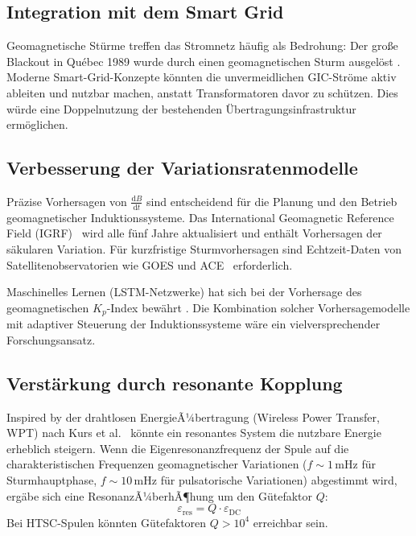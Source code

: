 ﻿\documentclass[a4paper,12pt]{article}
\theoremstyle{definition}
\begin{document}
\subsection{Integration mit dem Smart Grid}

Geomagnetische St\"urme treffen das Stromnetz h\"aufig als Bedrohung:
Der gro{\ss}e Blackout in Qu\'ebec 1989 wurde durch einen
geomagnetischen Sturm ausgel\"ost \cite{bolduc2002gic}. Moderne
Smart-Grid-Konzepte k\"onnten die unvermeidlichen GIC-Str\"ome
aktiv ableiten und nutzbar machen, anstatt Transformatoren davor zu sch\"utzen.
Dies w\"urde eine Doppelnutzung der bestehenden \"Ubertragungsinfrastruktur
erm\"oglichen.

\subsection{Verbesserung der Variationsratenmodelle}

Pr\"azise Vorhersagen von $\tfrac{\mathrm{d}B}{\mathrm{d}t}$ sind
entscheidend f\"ur die Planung und den Betrieb geomagnetischer
Induktionssysteme. Das International Geomagnetic Reference Field (IGRF)~\cite{thebault2015international}
wird alle f\"unf Jahre aktualisiert und enth\"alt Vorhersagen der
s\"akularen Variation. F\"ur kurzfristige Sturmvorhersagen sind
Echtzeit-Daten von Satellitenobservatorien wie GOES und
ACE~\cite{onsager2002operational} erforderlich.

Maschinelles Lernen (LSTM-Netzwerke) hat sich bei der Vorhersage
des geomagne\-tischen $K_p$-Index bew\"ahrt \cite{gruet2018multiple}.
Die Kombination solcher Vorhersagemodelle mit adaptiver Steuerung
der Induktionssysteme w\"are ein vielversprechender Forschungsansatz.

\subsection{Verst\"arkung durch resonante Kopplung}

Inspired by der drahtlosen EnergieÃ¼bertragung (Wireless Power Transfer, WPT)
nach Kurs et al.~\cite{kurs2007wireless} k\"onnte ein resonantes
System die nutzbare Energie erheblich steigern. Wenn die Eigenresonanzfrequenz
der Spule auf die charakteristischen Frequenzen geomagnetischer Variationen
($f \sim 1\,\mathrm{mHz}$ f\"ur Sturmhauptphase, $f \sim 10\,\mathrm{mHz}$
f\"ur pulsatorische Variationen) abgestimmt wird, erg\"abe sich eine
ResonanzÃ¼berhÃ¶hung um den G\"utefaktor $Q$:
\[
    \varepsilon_{\text{res}} = Q \cdot \varepsilon_{\text{DC}}
\]
Bei HTSC-Spulen k\"onnten G\"utefaktoren $Q > 10^4$ erreichbar sein.
\end{document}
